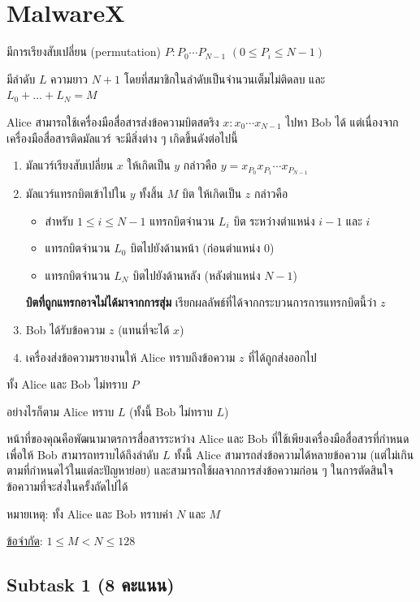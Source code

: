 \documentclass[12pt]{article}
\begin{document}
\section{MalwareX}

มีการเรียงสับเปลี่ยน (permutation) $P: P_0 \cdots P_{N-1}$ $(0 \leq P_i \leq N-1)$

มีลำดับ $L$ ความยาว $N+1$ โดยที่สมาชิกในลำดับเป็นจำนวนเต็มไม่ติดลบ และ $L_0 + \ldots + L_N = M$

Alice สามารถใช้เครื่องมือสื่อสารส่งข้อความบิตสตริง $x: x_0 \cdots x_{N-1}$ ไปหา Bob ได้ แต่เนื่องจากเครื่องมือสื่อสารติดมัลแวร์ จะมีสิ่งต่าง ๆ เกิดขึ้นดังต่อไปนี้
\begin{enumerate}
\item มัลแวร์เรียงสับเปลี่ยน $x$ ให้เกิดเป็น $y$  กล่าวคือ $y = x_{P_0} x_{P_1} \cdots x_{P_{N-1}}$
\item มัลแวร์แทรกบิตเข้าไปใน $y$ ทั้งสิ้น $M$ บิต ให้เกิดเป็น $z$ กล่าวคือ
\begin{itemize}[itemsep=1pt,parsep=1pt]
    \item สำหรับ $1 \leq i \leq N-1$ แทรกบิตจำนวน $L_i$ บิต ระหว่างตำแหน่ง $i-1$ และ $i$
\item แทรกบิตจำนวน $L_0$ บิตไปยังด้านหน้า (ก่อนตำแหน่ง $0$)
\item แทรกบิตจำนวน $L_N$ บิตไปยังด้านหลัง (หลังตำแหน่ง $N-1$)
\end{itemize}
\textbf{บิตที่ถูกแทรกอาจไม่ได้มาจากการสุ่ม} เรียกผลลัพธ์ที่ได้จากกระบวนการการแทรกบิตนี้ว่า $z$
\item Bob ได้รับข้อความ $z$ (แทนที่จะได้ $x$)
\item เครื่องส่งข้อความรายงานให้ Alice ทราบถึงข้อความ $z$ ที่ได้ถูกส่งออกไป
\end{enumerate}

ทั้ง Alice และ Bob ไม่ทราบ $P$

อย่างไรก็ตาม Alice ทราบ $L$  (ทั้งนี้ Bob ไม่ทราบ $L$)

หน้าที่ของคุณคือพัฒนามาตรการสื่อสารระหว่าง Alice และ Bob ที่ใช้เพียงเครื่องมือสื่อสารที่กำหนด เพื่อให้ Bob สามารถทราบได้ถึงลำดับ $L$  ทั้งนี้ Alice สามารถส่งข้อความได้หลายข้อความ (แต่ไม่เกินตามที่กำหนดไว้ในแต่ละปัญหาย่อย) และสามารถใช้ผลจากการส่งข้อความก่อน ๆ ในการตัดสินใจข้อความที่จะส่งในครั้งถัดไปได้

หมายเหตุ: ทั้ง Alice และ Bob ทราบค่า $N$ และ $M$

\underline{ข้อจำกัด}: $1 \leq M < N \leq 128$

\subsection{Subtask 1 (8 คะแนน)}
\end{document}
